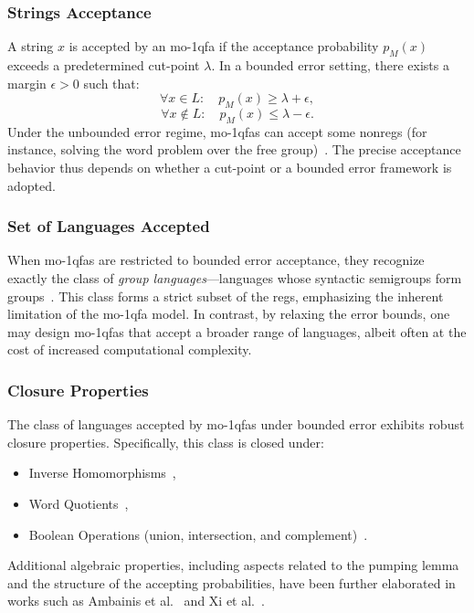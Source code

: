 \subsubsection{Strings Acceptance}
A string $x$ is accepted by an \gls{mo-1qfa} if the acceptance probability $p_M(x)$ exceeds a predetermined cut-point $\lambda$. In a bounded error setting, there exists a margin $\epsilon > 0$ such that:
\[
\forall x\in L:\quad p_M(x) \ge \lambda + \epsilon,
\]
\[
\forall x\notin L:\quad p_M(x) \le \lambda - \epsilon.
\]
Under the unbounded error regime, \glspl{mo-1qfa} can accept some non\glspl{reg} (for instance, solving the word problem over the free group)~\cite{brodsky2002characterizations}. The precise acceptance behavior thus depends on whether a cut-point or a bounded error framework is adopted.

\subsubsection{Set of Languages Accepted}
When \glspl{mo-1qfa} are restricted to bounded error acceptance, they recognize exactly the class of \emph{group languages}—languages whose syntactic semigroups form groups~\cite{brodsky2002characterizations}. This class forms a strict subset of the \glspl{reg}, emphasizing the inherent limitation of the \gls{mo-1qfa} model. In contrast, by relaxing the error bounds, one may design \glspl{mo-1qfa} that accept a broader range of languages, albeit often at the cost of increased computational complexity.

\subsubsection{Closure Properties}
The class of languages accepted by \glspl{mo-1qfa} under bounded error exhibits robust closure properties. Specifically, this class is closed under:
\begin{itemize}
    \item Inverse Homomorphisms~\cite{brodsky2002characterizations},
    \item Word Quotients~\cite{brodsky2002characterizations},
    \item Boolean Operations (union, intersection, and complement)~\cite{freivalds2005languages,bertoni2003quantum}.
\end{itemize}
Additional algebraic properties, including aspects related to the pumping lemma and the structure of the accepting probabilities, have been further elaborated in works such as Ambainis et al.~\cite{ambainis1999probabilities} and Xi et al.~\cite{xi2008some}.

